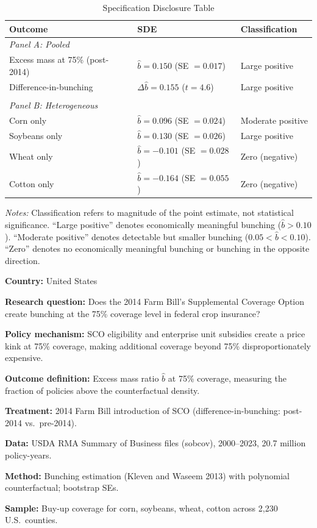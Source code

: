\begin{table}[htbp]
\centering
\caption{Specification Disclosure Table}
\label{tab:sde}
\begin{threeparttable}
\begin{tabular}{p{4cm}p{3.5cm}p{3cm}}
\toprule
\textbf{Outcome} & \textbf{SDE} & \textbf{Classification} \\
\midrule
\multicolumn{3}{l}{\textit{Panel A: Pooled}} \\[3pt]
Excess mass at 75\% (post-2014) & $\hat{b} = 0.150$ (SE $= 0.017$) & Large positive \\
Difference-in-bunching & $\Delta\hat{b} = 0.155$ ($t = 4.6$) & Large positive \\
\\
\multicolumn{3}{l}{\textit{Panel B: Heterogeneous}} \\[3pt]
Corn only & $\hat{b} = 0.096$ (SE $= 0.024$) & Moderate positive \\
Soybeans only & $\hat{b} = 0.130$ (SE $= 0.026$) & Large positive \\
Wheat only & $\hat{b} = -0.101$ (SE $= 0.028$) & Zero (negative) \\
Cotton only & $\hat{b} = -0.164$ (SE $= 0.055$) & Zero (negative) \\
\bottomrule
\end{tabular}
\begin{tablenotes}[flushleft]
\footnotesize
\item \textit{Notes:} Classification refers to magnitude of the point estimate, not statistical significance. ``Large positive'' denotes economically meaningful bunching ($\hat{b} > 0.10$). ``Moderate positive'' denotes detectable but smaller bunching ($0.05 < \hat{b} < 0.10$). ``Zero'' denotes no economically meaningful bunching or bunching in the opposite direction.
\item \textbf{Country:} United States
\item \textbf{Research question:} Does the 2014 Farm Bill's Supplemental Coverage Option create bunching at the 75\% coverage level in federal crop insurance?
\item \textbf{Policy mechanism:} SCO eligibility and enterprise unit subsidies create a price kink at 75\% coverage, making additional coverage beyond 75\% disproportionately expensive.
\item \textbf{Outcome definition:} Excess mass ratio $\hat{b}$ at 75\% coverage, measuring the fraction of policies above the counterfactual density.
\item \textbf{Treatment:} 2014 Farm Bill introduction of SCO (difference-in-bunching: post-2014 vs.\ pre-2014).
\item \textbf{Data:} USDA RMA Summary of Business files (sobcov), 2000--2023, 20.7 million policy-years.
\item \textbf{Method:} Bunching estimation (Kleven and Waseem 2013) with polynomial counterfactual; bootstrap SEs.
\item \textbf{Sample:} Buy-up coverage for corn, soybeans, wheat, cotton across 2,230 U.S.\ counties.
\end{tablenotes}
\end{threeparttable}
\end{table}
